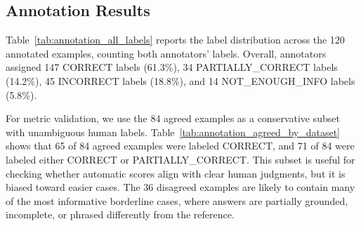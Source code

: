 \documentclass[11pt]{article}
\begin{document}
\subsection{Annotation Results}

Table~\ref{tab:annotation_all_labels} reports the label distribution across the 120 annotated examples, counting both annotators' labels. Overall, annotators assigned 147 CORRECT labels (61.3\%), 34 PARTIALLY\_CORRECT labels (14.2\%), 45 INCORRECT labels (18.8\%), and 14 NOT\_ENOUGH\_INFO labels (5.8\%).

\begin{table}[t]
\centering
\small
\caption{Distribution of individual annotation labels across both annotators.}
\label{tab:annotation_all_labels}
\end{table}

For metric validation, we use the 84 agreed examples as a conservative subset with unambiguous human labels. Table~\ref{tab:annotation_agreed_by_dataset} shows that 65 of 84 agreed examples were labeled CORRECT, and 71 of 84 were labeled either CORRECT or PARTIALLY\_CORRECT. This subset is useful for checking whether automatic scores align with clear human judgments, but it is biased toward easier cases. The 36 disagreed examples are likely to contain many of the most informative borderline cases, where answers are partially grounded, incomplete, or phrased differently from the reference.

\begin{table}[t]
\centering
\small
\caption{Human labels for agreed annotation examples only.}
\label{tab:annotation_agreed_by_dataset}
\end{table}
\end{document}
